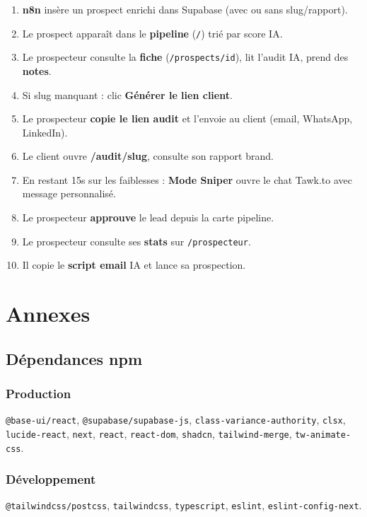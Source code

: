 \documentclass[11pt,a4paper]{report}
\begin{document}
\begin{enumerate}[leftmargin=*]
  \item \textbf{n8n} insère un prospect enrichi dans Supabase (avec ou sans slug/rapport).
  \item Le prospect apparaît dans le \textbf{pipeline} (\texttt{/}) trié par score IA.
  \item Le prospecteur consulte la \textbf{fiche} (\texttt{/prospects/id}), lit l'audit IA, prend des \textbf{notes}.
  \item Si slug manquant : clic \textbf{Générer le lien client}.
  \item Le prospecteur \textbf{copie le lien audit} et l'envoie au client (email, WhatsApp, LinkedIn).
  \item Le client ouvre \textbf{/audit/slug}, consulte son rapport brand.
  \item En restant 15s sur les faiblesses : \textbf{Mode Sniper} ouvre le chat Tawk.to avec message personnalisé.
  \item Le prospecteur \textbf{approuve} le lead depuis la carte pipeline.
  \item Le prospecteur consulte ses \textbf{stats} sur \texttt{/prospecteur}.
  \item Il copie le \textbf{script email} IA et lance sa prospection.
\end{enumerate}

\chapter{Annexes}

\section{Dépendances npm}

\subsection{Production}
\texttt{@base-ui/react}, \texttt{@supabase/supabase-js}, \texttt{class-variance-authority}, \texttt{clsx}, \texttt{lucide-react}, \texttt{next}, \texttt{react}, \texttt{react-dom}, \texttt{shadcn}, \texttt{tailwind-merge}, \texttt{tw-animate-css}.

\subsection{Développement}
\texttt{@tailwindcss/postcss}, \texttt{tailwindcss}, \texttt{typescript}, \texttt{eslint}, \texttt{eslint-config-next}.
\end{document}

